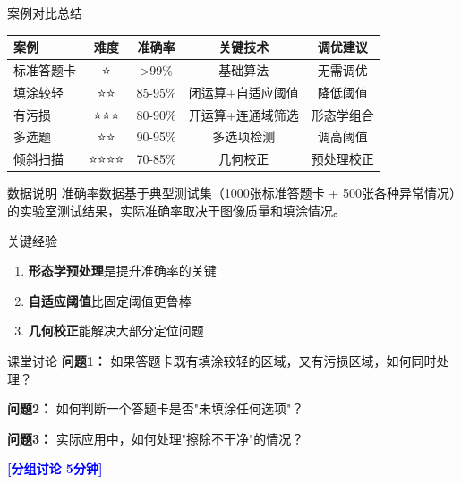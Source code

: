 \begin{frame}{案例对比总结}
    \begin{table}
        \centering
        \small
        \begin{tabular}{l|c|c|c|c}
        \toprule
        案例 & 难度 & 准确率 & 关键技术 & 调优建议 \\
        \midrule
        标准答题卡 & ⭐ & >99\% & 基础算法 & 无需调优 \\
        填涂较轻 & ⭐⭐ & 85-95\% & 闭运算+自适应阈值 & 降低阈值 \\
        有污损 & ⭐⭐⭐ & 80-90\% & 开运算+连通域筛选 & 形态学组合 \\
        多选题 & ⭐⭐ & 90-95\% & 多选项检测 & 调高阈值 \\
        倾斜扫描 & ⭐⭐⭐⭐ & 70-85\% & 几何校正 & 预处理校正 \\
        \bottomrule
        \end{tabular}
    \end{table}

    \begin{alertblock}{数据说明}
    准确率数据基于典型测试集（1000张标准答题卡 + 500张各种异常情况）的实验室测试结果，实际准确率取决于图像质量和填涂情况。
    \end{alertblock}

    \begin{alertblock}{关键经验}
    \begin{enumerate}
        \item \textbf{形态学预处理}是提升准确率的关键
        \item \textbf{自适应阈值}比固定阈值更鲁棒
        \item \textbf{几何校正}能解决大部分定位问题
    \end{enumerate}
    \end{alertblock}
\end{frame}

\begin{frame}{课堂讨论}
    \textbf{问题1：} 如果答题卡既有填涂较轻的区域，又有污损区域，如何同时处理？

    \vspace{0.2cm}

    \textbf{问题2：} 如何判断一个答题卡是否"未填涂任何选项"？

    \vspace{0.2cm}

    \textbf{问题3：} 实际应用中，如何处理"擦除不干净"的情况？

    \vspace{0.5cm}

    \begin{center}
        \textcolor{blue}{\textbf{[分组讨论 5分钟]}}
    \end{center}
\end{frame}
